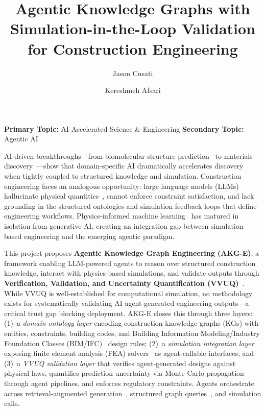 \documentclass[conference, 10pt]{IEEEtran}
\title{Agentic Knowledge Graphs with Simulation-in-the-Loop Validation\\for Construction Engineering}
\author{Jason Cusati \and Kereshmeh Afsari}
\date{}
\begin{document}
\maketitle
\thispagestyle{empty}

\vspace{-1.5em}

\noindent\textbf{Primary Topic:} AI Accelerated Science \& Engineering \hfill
\textbf{Secondary Topic:} Agentic AI

\vspace{0.5em}

AI-driven breakthroughs---from biomolecular structure prediction~\cite{Abramson2024AlphaFold3} to materials discovery~\cite{Merchant2023GNoME}---show that domain-specific AI dramatically accelerates discovery when tightly coupled to structured knowledge and simulation. Construction engineering faces an analogous opportunity: large language models (LLMs) hallucinate physical quantities~\cite{Ji2023HallucinationSurvey}, cannot enforce constraint satisfaction, and lack grounding in the structured ontologies and simulation feedback loops that define engineering workflows. Physics-informed machine learning~\cite{Karniadakis2021PINN} has matured in isolation from generative AI, creating an integration gap between simulation-based engineering and the emerging agentic paradigm.

This project proposes \textbf{Agentic Knowledge Graph Engineering (AKG-E)}, a framework enabling LLM-powered agents to reason over structured construction knowledge, interact with physics-based simulations, and validate outputs through \textbf{Verification, Validation, and Uncertainty Quantification (VVUQ)}~\cite{Oberkampf2010VVUQ}. While VVUQ is well-established for computational simulation, no methodology exists for systematically validating AI agent-generated engineering outputs---a critical trust gap blocking deployment. AKG-E closes this through three layers: (1)~a \textit{domain ontology layer} encoding construction knowledge graphs (KGs) with entities, constraints, building codes, and Building Information Modeling/Industry Foundation Classes (BIM/IFC)~\cite{Eastman2011BIM} design rules; (2)~a \textit{simulation integration layer} exposing finite element analysis (FEA) solvers~\cite{Logg2012FEniCS} as agent-callable interfaces; and (3)~a \textit{VVUQ validation layer} that verifies agent-generated designs against physical laws, quantifies prediction uncertainty via Monte Carlo propagation through agent pipelines, and enforces regulatory constraints. Agents orchestrate across retrieval-augmented generation~\cite{Lewis2020RAG}, structured graph queries~\cite{Edge2024GraphRAG}, and simulation calls.
\end{document}
